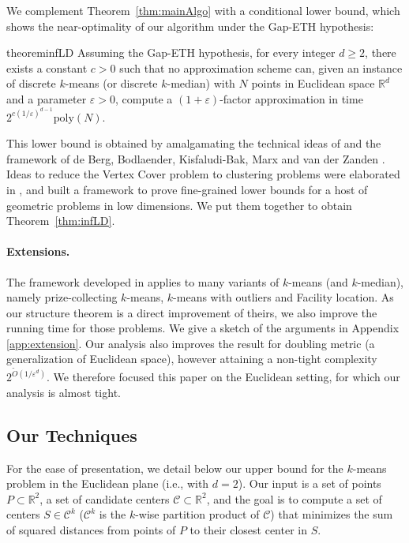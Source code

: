 \documentclass[11pt]{article}
\newcommand{\R}{\mathbb R}
\newcommand{\eps}{\varepsilon}
\newcommand{\poly}{\mathrm{ poly}}
\renewcommand{\tilde}{\widetilde}
\newcommand{\calC}{\mathcal {C}}
\begin{document}
We complement Theorem~\ref{thm:mainAlgo} with a conditional lower bound, which shows the near-optimality of our algorithm under the Gap-ETH hypothesis:


\begin{restatable}{theorem}{infLD}
    \label{thm:infLD}
Assuming the Gap-ETH hypothesis, for every integer $d \ge 2$, there exists a constant $c > 0$ such that no approximation scheme can, given an instance of discrete $k$-means (or discrete $k$-median) with $N$ points in Euclidean space $\mathbb{R}^d$ and a parameter $\eps > 0$, compute a $(1+\eps)$-factor approximation in time $2^{c(1/\eps)^{d-1}} \poly(N)$.
\end{restatable}



This lower bound is obtained by amalgamating the technical ideas of \cite{LeeSW17,CohenaddadSODA18,Cohen-AddadS19} and the framework of de Berg, Bodlaender, Kisfaludi-Bak, Marx and van der Zanden \cite{BergBKMZ20}. Ideas to reduce the Vertex Cover problem to clustering problems were elaborated in \cite{LeeSW17,CohenaddadSODA18,Cohen-AddadS19}, and \cite{BergBKMZ20} built a framework  to prove fine-grained lower bounds for a host of geometric problems in low dimensions. We put them together to obtain Theorem~\ref{thm:infLD}.

\paragraph*{Extensions.}
The framework developed in \cite{jacm} applies to many variants of $k$-means (and $k$-median), namely prize-collecting $k$-means, $k$-means with outliers and Facility location. As our structure theorem is a direct improvement of theirs, we also improve the running time for those problems. We give a sketch of the arguments in Appendix \ref{app:extension}. 
Our analysis also improves the result for doubling metric (a generalization of Euclidean space), however attaining a non-tight complexity $2^{\tilde O(1/\eps^d)}$. 
We therefore focused this paper on the Euclidean setting, for which our analysis is almost tight.

\subsection{Our Techniques}\label{sec:overview}
For the ease of presentation, we detail below our upper bound for the $k$-means problem in the Euclidean plane (i.e., with $d=2$). Our input is a set of points  $P \subset \R^2$, a set of candidate centers $\calC\subset \R^2$, and the goal is to compute a set of centers $S \in \calC^k$ ($\calC^k$ is the $k$-wise partition product of $\calC$) that minimizes the sum of  squared distances from points of $P$ to their closest center in $S$.
\end{document}
